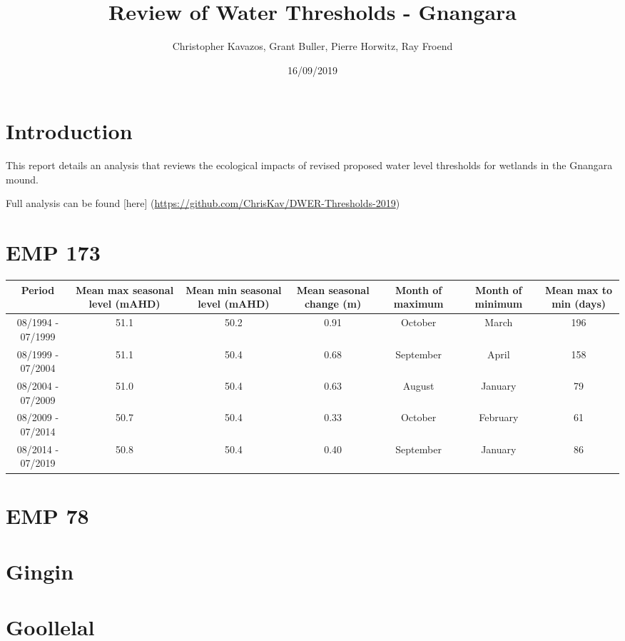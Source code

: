 \documentclass[]{article}
\title{Review of Water Thresholds - Gnangara}
\author{Christopher Kavazos, Grant Buller, Pierre Horwitz, Ray Froend}
\date{16/09/2019}
\begin{document}
\maketitle

\hypertarget{introduction}{%
\section{Introduction}\label{introduction}}

This report details an analysis that reviews the ecological impacts of
revised proposed water level thresholds for wetlands in the Gnangara
mound.

Full analysis can be found {[}here{]}
(\url{https://github.com/ChrisKav/DWER-Thresholds-2019})

\hypertarget{emp-173}{%
\section{EMP 173}\label{emp-173}}

\begin{tabular}{c|c|c|c|c|c|c}
\hline
Period & Mean max seasonal level (mAHD) & Mean min seasonal level (mAHD) & Mean seasonal change (m) & Month of maximum & Month of minimum & Mean max to min (days)\\
\hline
08/1994 - 07/1999 & 51.1 & 50.2 & 0.91 & October & March & 196\\
\hline
08/1999 - 07/2004 & 51.1 & 50.4 & 0.68 & September & April & 158\\
\hline
08/2004 - 07/2009 & 51.0 & 50.4 & 0.63 & August & January & 79\\
\hline
08/2009 - 07/2014 & 50.7 & 50.4 & 0.33 & October & February & 61\\
\hline
08/2014 - 07/2019 & 50.8 & 50.4 & 0.40 & September & January & 86\\
\hline
\end{tabular}

\hypertarget{emp-78}{%
\section{EMP 78}\label{emp-78}}

\hypertarget{gingin}{%
\section{Gingin}\label{gingin}}

\hypertarget{goollelal}{%
\section{Goollelal}\label{goollelal}}
\end{document}

